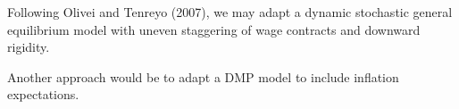 \documentclass[12pt]{article}
\begin{document}
	Following Olivei and Tenreyo (2007), we may adapt a dynamic stochastic general equilibrium model with uneven staggering of wage contracts and downward rigidity.

	Another approach would be to adapt a DMP model to include inflation expectations. \cite{fukuiTheoryWageRigidity}



	\newpage
	
	
	
\end{document}
